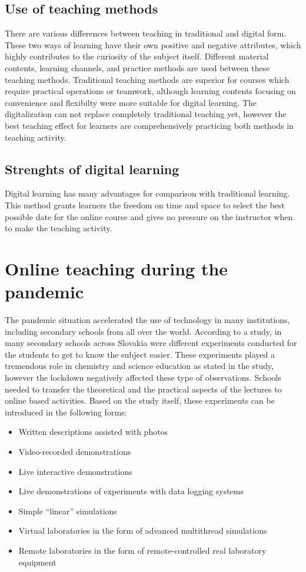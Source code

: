 \documentclass[10pt,oneside,english,a4paper]{article}
\begin{document}
\subsection{Use of teaching methods}

	There are various differences between teaching in traditional and digital form. These two ways of learning have their own positive and negative attributes, which highly contributes to the curiosity of the subject itself. Different material contents, learning channels, and practice methods are used between these teaching methods. Traditional teaching methods are superior for courses which require practical operations or teamwork, although learning contents focusing on convenience and flexibilty were more suitable for digital  learning. The digitalization can not replace completely traditional teaching yet, however the best teaching effect for learners are comprehensively practicing both methods in teaching activity.\cite{Lin2017}

\subsection{Strenghts of digital learning}

	Digital learning has many advantages for comparison with traditional learning. This method grants learners the freedom on time and space to select the best possible date for the online course and gives no pressure on the instructor when to make the teaching activity.  \cite{Lin2017}


\section{Online teaching during the pandemic}\label{covid}

	The pandemic situation accelerated the use of technology in many institutions, including secondary schools from all over the world. According to a study\cite{Babinkov2020}, in many secondary schools across Slovakia were different experiments conducted for the students to get to know the subject easier. These experiments played a tremendous role in chemistry and science education as stated in the study, however the lockdown negatively affected these type of observations. Schools needed to transfer the theoretical and the practical aspects of the lectures to online based activities. Based on the study itself\cite{Babinkov2020}, these experiments can be introduced in the following forms:
\begin{itemize}
\item Written descriptions assisted with photos
\item Video-recorded demonstrations
\item Live interactive demonstrations
\item Live demonstrations of experiments with data logging systems
\item Simple “linear” simulations
\item Virtual laboratories in the form of advanced multithread simulations
\item Remote laboratories in the form of remote-controlled real laboratory equipment
\end{itemize}
\end{document}
